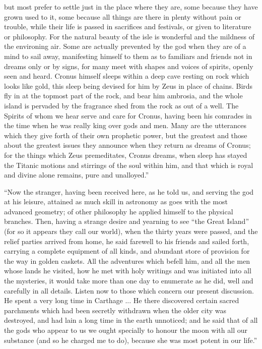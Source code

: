 \documentclass[a4paper, 11pt, oneside, polutonikogreek, english]{article}
\begin{document}
but most prefer to settle just in the place where they are, some because they have grown used to it, some because all things are there in plenty without pain or trouble, while their life is passed in sacrifices and festivals, or given to literature or philosophy. For the natural beauty of the isle is wonderful and the mildness of the environing air. Some are actually prevented by the god when they are of a mind to sail away, manifesting himself to them as to familiars and friends not in dreams only or by signs, for many meet with shapes and voices of spirits, openly seen and heard. Cronus himself sleeps within a deep cave resting on rock which looks like gold, this sleep being devised for him by Zeus in place of chains. Birds fly in at the topmost part of the rock, and bear him ambrosia, and the whole island is pervaded by the fragrance shed from the rock as out of a well. The Spirits of whom we hear serve and care for Cronus, having been his comrades in the time when he was really king over gods and men. Many are the utterances which they give forth of their own prophetic power, but the greatest and those about the greatest issues they announce when they return as dreams of Cronus; for the things which Zeus premeditates, Cronus dreams, when sleep has stayed the Titanic motions and stirrings of the soul within him, and that which is royal and divine alone remains, pure and unalloyed.''

``Now the stranger, having been received here, as he told us, and serving the god at his leisure, attained as much skill in astronomy as goes with the most advanced geometry; of other philosophy he applied himself to the physical branches. Then, having a strange desire and yearning to see ``the Great Island'' (for so it appears they call our world), when the thirty years were passed, and the relief parties arrived from home, he said farewell to his friends and sailed forth, carrying a complete equipment of all kinds, and abundant store of provision for the way in golden caskets. All the adventures which befell him, and all the men whose lands he visited, how he met with holy writings and was initiated into all the mysteries, it would take more than one day to enumerate as he did, well and carefully in all details. Listen now to those which concern our present discussion. He spent a very long time in Carthage ... He there discovered certain sacred parchments which had been secretly withdrawn when the older city was destroyed, and had lain a long time in the earth unnoticed; and he said that of all the gods who appear to us we ought specially to honour the moon with all our substance (and so he charged me to do), because she was most potent in our life.''
\end{document}
